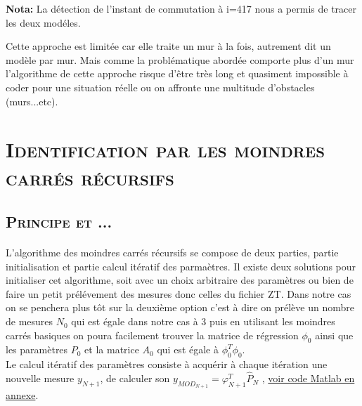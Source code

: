 	\textbf{Nota:} La détection de l'instant de commutation à i=417 nous a permis de tracer les deux modéles. \\[1cm] 
	
	\par Cette approche est limitée car elle traite un mur à la fois, autrement dit un modèle par mur. Mais comme la problématique abordée comporte plus d'un mur l'algorithme de cette approche risque d'être très long et quasiment impossible à coder pour une situation réelle ou on affronte une multitude d'obstacles (murs...etc). 
	

\section{\textsc{Identification par les moindres carrés récursifs}}
\subsection{\textsc{ Principe et ... }}

	\paragraph{} L'algorithme des moindres carrés récursifs se compose de deux parties, partie initialisation et partie calcul itératif des parmaètres. Il existe deux solutions pour initialiser cet algorithme, soit avec un choix arbitraire des paramètres ou bien de faire un petit prélévement des mesures donc celles du fichier ZT. Dans notre cas on se penchera plus tôt sur la deuxième option c'est à dire on prélève un nombre de mesures $N_0$ qui est égale dans notre cas à $3$ puis en utilisant les moindres carrés basiques on poura facilement trouver la matrice de régression $\phi_0$ ainsi que les paramètres $P_0$ et la matrice $A_0$ qui est égale à $\phi^{T}_{0} \phi_0$.\\
Le calcul itératif des paramètres consiste à acquérir à chaque itération une nouvelle mesure $y_{N+1}$, de calculer son $y_{MOD_{N+1}} = \varphi^{T}_{N+1} \hat{P}_N$
, \label{section 1.3.1} \hyperref[Annexe B] {voir code Matlab en annexe}. 
